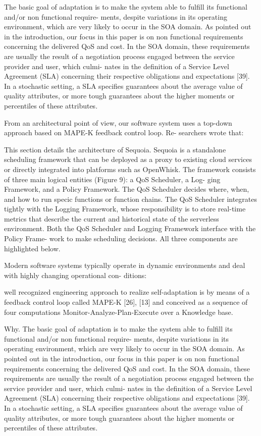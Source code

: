\documentclass[12pt,a4paper]{report}
\begin{document}
The basic goal of adaptation is to make the system
able to fulfill its functional and/or non functional require-
ments, despite variations in its operating environment,
which are very likely to occur in the SOA domain. As
pointed out in the introduction, our focus in this paper is
on non functional requirements concerning the delivered
QoS and cost. In the SOA domain, these requirements
are usually the result of a negotiation process engaged
between the service provider and user, which culmi-
nates in the definition of a Service Level Agreement (SLA)
concerning their respective obligations and expectations
[39]. In a stochastic setting, a SLA specifies guarantees
about the average value of quality attributes, or more
tough guarantees about the higher moments or percentiles
of these attributes.





From an architectural point of view, our software system uses a top-down approach based on MAPE-K feedback control loop. Re-
searchers wrote that:


This section details the architecture of Sequoia. Sequoia is a
standalone scheduling framework that can be deployed as a
proxy to existing cloud services or directly integrated into
platforms such as OpenWhisk. The framework consists of
three main logical entities (Figure 9): a QoS Scheduler, a Log-
ging Framework, and a Policy Framework. The QoS Scheduler
decides where, when, and how to run specic functions or
function chains. The QoS Scheduler integrates tightly with
the Logging Framework, whose responsibility is to store
real-time metrics that describe the current and historical
state of the serverless environment. Both the QoS Scheduler
and Logging Framework interface with the Policy Frame-
work to make scheduling decisions. All three components
are highlighted below.


Modern software systems typically operate in dynamic
environments and deal with highly changing operational con-
ditions: 

 well recognized engineering approach
to realize self-adaptation is by means of a feedback control
loop called MAPE-K [26], [13] and conceived as a sequence
of four computations Monitor-Analyze-Plan-Execute over a
Knowledge base.


Why. The basic goal of adaptation is to make the system
able to fulfill its functional and/or non functional require-
ments, despite variations in its operating environment,
which are very likely to occur in the SOA domain. As
pointed out in the introduction, our focus in this paper is
on non functional requirements concerning the delivered
QoS and cost. In the SOA domain, these requirements
are usually the result of a negotiation process engaged
between the service provider and user, which culmi-
nates in the definition of a Service Level Agreement (SLA)
concerning their respective obligations and expectations
[39]. In a stochastic setting, a SLA specifies guarantees
about the average value of quality attributes, or more
tough guarantees about the higher moments or percentiles
of these attributes.
\end{document}
